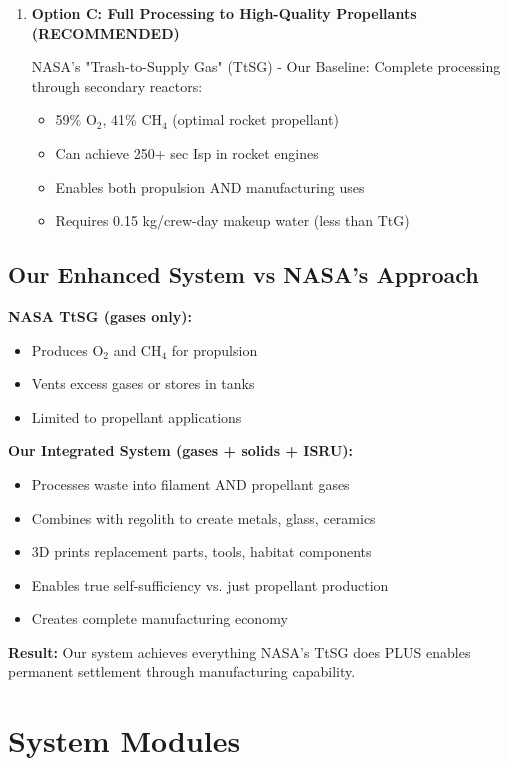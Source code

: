 \documentclass[12pt, a4paper]{article}
\begin{document}
\begin{enumerate}
    \item \textbf{Option C: Full Processing to High-Quality Propellants (RECOMMENDED)}
    
    NASA's "Trash-to-Supply Gas" (TtSG) - Our Baseline: Complete processing through secondary reactors:
    \begin{itemize}
        \item 59\% O$_2$, 41\% CH$_4$ (optimal rocket propellant)
        \item Can achieve 250+ sec Isp in rocket engines
        \item Enables both propulsion AND manufacturing uses
        \item Requires 0.15 kg/crew-day makeup water (less than TtG)
    \end{itemize}
\end{enumerate}

\subsection{Our Enhanced System vs NASA's Approach}

\textbf{NASA TtSG (gases only):}
\begin{itemize}
    \item Produces O$_2$ and CH$_4$ for propulsion
    \item Vents excess gases or stores in tanks
    \item Limited to propellant applications
\end{itemize}

\textbf{Our Integrated System (gases + solids + ISRU):}
\begin{itemize}
    \item Processes waste into filament AND propellant gases
    \item Combines with regolith to create metals, glass, ceramics
    \item 3D prints replacement parts, tools, habitat components
    \item Enables true self-sufficiency vs. just propellant production
    \item Creates complete manufacturing economy
\end{itemize}

\textbf{Result:} Our system achieves everything NASA's TtSG does PLUS enables permanent settlement through manufacturing capability.

\section{System Modules}
\end{document}
